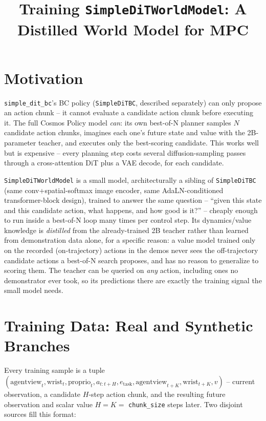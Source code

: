 \documentclass[11pt]{article}
\title{Training \texttt{SimpleDiTWorldModel}: A Distilled World Model for MPC}
\author{}
\date{}
\begin{document}
\maketitle

\section{Motivation}

\texttt{simple\_dit\_bc}'s BC policy (\texttt{SimpleDiTBC}, described separately) can only propose
an action chunk -- it cannot evaluate a candidate action chunk before executing it. The full Cosmos
Policy model \emph{can}: its own best-of-N planner samples $N$ candidate action chunks, imagines
each one's future state and value with the 2B-parameter teacher, and executes only the
best-scoring candidate. This works well but is expensive -- every planning step costs several
diffusion-sampling passes through a cross-attention DiT plus a VAE decode, for each candidate.

\texttt{SimpleDiTWorldModel} is a small model, architecturally a sibling of \texttt{SimpleDiTBC}
(same conv+spatial-softmax image encoder, same AdaLN-conditioned transformer-block design), trained
to answer the same question -- ``given this state and this candidate action, what happens, and how
good is it?'' -- cheaply enough to run inside a best-of-N loop many times per control step. Its
dynamics/value knowledge is \emph{distilled} from the already-trained 2B teacher rather than
learned from demonstration data alone, for a specific reason: a value model trained only on the
recorded (on-trajectory) actions in the demos never sees the off-trajectory candidate actions a
best-of-N search proposes, and has no reason to generalize to scoring them. The teacher can be
queried on \emph{any} action, including ones no demonstrator ever took, so its predictions there
are exactly the training signal the small model needs.

\section{Training Data: Real and Synthetic Branches}

Every training sample is a tuple
$(\text{agentview}_t, \text{wrist}_t, \text{proprio}_t, a_{t:t+H}, e_{\text{task}}, \text{agentview}_{t+K}, \text{wrist}_{t+K}, v)$
-- current observation, a candidate $H$-step action chunk, and the resulting future observation and
scalar value $H=K=$ \texttt{chunk\_size} steps later. Two disjoint sources fill this format:
\end{document}
